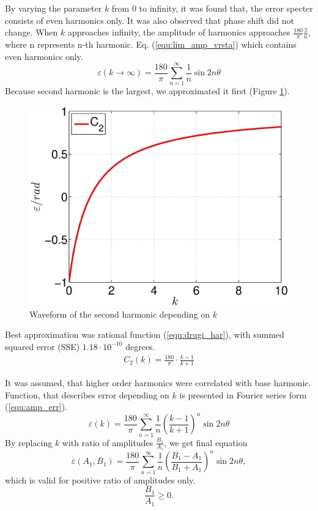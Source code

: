 \documentclass[a4paper]{article}
\begin{document}
By varying the parameter $k$ from 0 to infinity, it was found that, the error specter consists of even harmonics only. It was also observed that phase shift did not change. When $k$ approaches infinity, the amplitude of harmonics approaches $\frac{180}{\pi}\frac{2}{n}$, where n represents n-th harmonic. Eq. (\ref{equ:lim_amp_vrsta}) which contains even harmonics only.
\begin{equation}
\label{equ:lim_amp_vrsta}
\varepsilon(k \rightarrow \infty) = \frac{180}{\pi}\sum_{n=1}^{\infty}\frac{1}{n} \sin 2 n \theta
\end{equation}
Because second harmonic is the largest, we approximated it first (Figure \ref{fig:amp}).
\begin{figure}[!htb]
	\begin{center}
		\includegraphics[width=\linewidth]{./Slike/amp.eps}
		\caption{Waveform of the second harmonic depending on $k$} \label{fig:amp}
	\end{center}
\end{figure}

Best approximation was rational function  (\ref{equ:drugi_har}), with summed squared error (SSE) $1.18 \cdot 10^{-10}$ degrees.
\begin{eqnarray}
\label{equ:drugi_har}
C_2(k)=\frac{180}{\pi}\cdot\frac{k-1}{k+1}
\end{eqnarray}

It was assumed, that higher order harmonics were correlated with base harmonic. Function, that describes error  depending on $k$ is presented in Fourier series form (\ref{equ:amp_err}).
\begin{equation}
\label{equ:amp_err}
\varepsilon(k) =\frac{180}{\pi}\sum_{n=1}^{\infty}\frac{1}{n}(\frac{k-1}{k+1})^n \sin 2 n \theta
\end{equation}
By replacing $k$ with ratio of amplitudes $\frac{B_1}{A_1}$, we get final equation
\begin{equation}
\label{equ:amp_err2}
\varepsilon(A_1, B_1) =\frac{180}{\pi}\sum_{n=1}^{\infty}\frac{1}{n}(\frac{B_1-A_1}{B_1+A_1})^n \sin 2 n \theta,
\end{equation}
which is valid for positive ratio of amplitudes only.
 $$\frac{B_1}{A_1} \geq 0.$$
\end{document}

